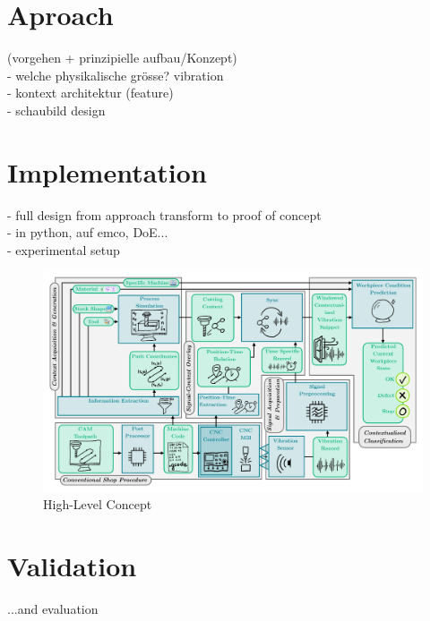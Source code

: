 \documentclass[5p,times,procedia]{elsarticle}
\newenvironment{note}{%
	\noindent
    \color{notecolor}%
}{%
    \par\medskip%
}
\begin{document}
\section{Aproach}
\begin{note}
	(vorgehen + prinzipielle aufbau/Konzept)\\
	- welche physikalische grösse? vibration\\
	- kontext architektur (feature)\\
	- schaubild design\\
	
\end{note}




\section{Implementation}

\begin{note}
- full design from approach transform to proof of concept\\
- in python, auf emco, DoE...\\
- experimental setup	
\end{note}

\begin{figure}[t]
    \centering
    \includegraphics[width=0.99\linewidth]{ConceptDiagram.pdf}
    \caption{High-Level Concept}
    \label{Fig_ConceptDiagram}
\end{figure}
 
 
\section{Validation}
\begin{note}
	...and evaluation

\end{note}
\end{document}
